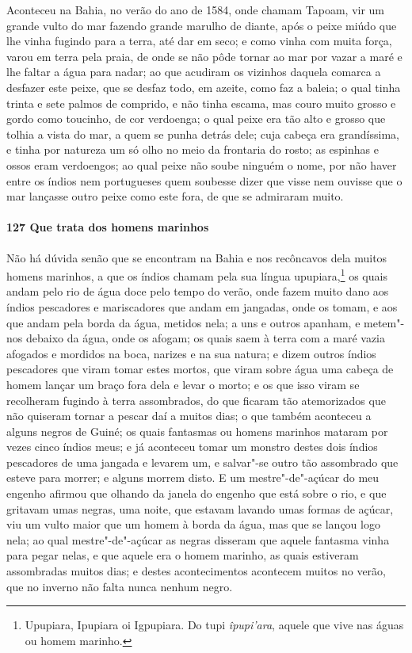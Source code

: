 Aconteceu na Bahia, no verão do ano de 1584, onde chamam Tapoam, vir um grande vulto do
mar fazendo grande marulho de diante, após o peixe miúdo que lhe vinha fugindo para a
terra, até dar em seco; e como vinha com muita força, varou em terra pela praia, de onde
se não pôde tornar ao mar por vazar a maré e lhe faltar a água para nadar; ao que acudiram
os vizinhos daquela comarca a desfazer este peixe, que se desfaz todo, em azeite, como faz
a baleia; o qual tinha trinta e sete palmos de comprido, e não tinha escama, mas couro
muito grosso e gordo como toucinho, de cor verdoenga; o qual peixe era tão alto e grosso
que tolhia a vista do mar, a quem se punha detrás dele; cuja cabeça era grandíssima, e
tinha por natureza um só olho no meio da frontaria do rosto; as espinhas e ossos eram
verdoengos; ao qual peixe não soube ninguém o nome, por não haver entre os índios nem
portugueses quem soubesse dizer que visse nem ouvisse que o mar lançasse outro peixe como
este fora, de que se admiraram muito.

\paragraph{127 Que trata dos homens marinhos}

Não há dúvida senão que se encontram na Bahia e nos recôncavos dela muitos homens
marinhos, a que os índios chamam pela sua língua upupiara,\footnote{ Upupiara, Ipupiara oi
Igpupiara. Do tupi \textit{îpupi'ara}, aquele que vive nas águas ou homem marinho.} os
quais andam pelo rio de água doce pelo tempo do verão, onde fazem muito dano aos índios
pescadores e mariscadores que andam em jangadas, onde os tomam, e aos que andam pela borda
da água, metidos nela; a uns e outros apanham, e metem"-nos debaixo da água, onde os
afogam; os quais saem à terra com a maré vazia afogados e mordidos na boca, narizes e na
sua natura; e dizem outros índios pescadores que viram tomar estes mortos, que viram sobre
água uma cabeça de homem lançar um braço fora dela e levar o morto; e os que isso viram se
recolheram fugindo à terra assombrados, do que ficaram tão atemorizados que não quiseram
tornar a pescar daí a muitos dias; o que também aconteceu a alguns negros de Guiné; os
quais fantasmas ou homens marinhos mataram por vezes cinco índios meus; e já aconteceu
tomar um monstro destes dois índios pescadores de uma jangada e levarem um, e salvar"-se
outro tão assombrado que esteve para morrer; e alguns morrem disto. E um mestre"-de"-açúcar
do meu engenho afirmou que olhando da janela do engenho que está sobre o rio, e que
gritavam umas negras, uma noite, que estavam lavando umas formas de açúcar, viu um vulto
maior que um homem à borda da água, mas que se lançou logo nela; ao qual mestre"-de"-açúcar
as negras disseram que aquele fantasma vinha para pegar nelas, e que aquele era o homem
marinho, as quais estiveram assombradas muitos dias; e destes acontecimentos acontecem
muitos no verão, que no inverno não falta nunca nenhum negro.

